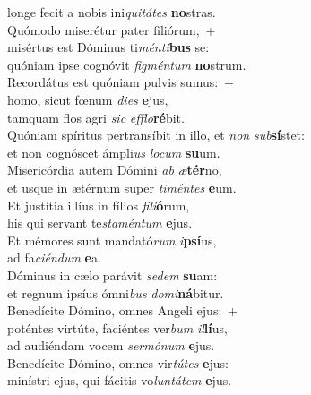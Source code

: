\evenverse longe fecit a nobis ini\textit{qui}\textit{tá}\textit{tes} \textbf{no}stras.\\
\oddverse Quómodo miserétur pater filiórum,~+\\
\oddverse  misértus est Dóminus ti\textit{mén}\textit{ti}\textbf{bus} se:~\*\\
\oddverse quóniam ipse cognóvit \textit{fig}\textit{mén}\textit{tum} \textbf{no}strum.\\
\evenverse Recordátus est quóniam pulvis sumus:~+\\
\evenverse  homo, sicut fœnum \textit{di}\textit{es} \textbf{e}jus,~\*\\
\evenverse tamquam flos agri \textit{sic} \textit{ef}\textit{flo}\textbf{ré}bit.\\
\oddverse Quóniam spíritus pertransíbit in illo, et \textit{non} \textit{sub}\textbf{sí}stet:~\*\\
\oddverse et non cognóscet ámpli\textit{us} \textit{lo}\textit{cum} \textbf{su}um.\\
\evenverse Misericórdia autem Dómini \textit{ab} \textit{æ}\textbf{tér}no,~\*\\
\evenverse et usque in ætérnum super \textit{ti}\textit{mén}\textit{tes} \textbf{e}um.\\
\oddverse Et justítia illíus in fílios \textit{fi}\textit{li}\textbf{ó}rum,~\*\\
\oddverse his qui servant te\textit{sta}\textit{mén}\textit{tum} \textbf{e}jus.\\
\evenverse Et mémores sunt mandató\textit{rum} \textit{i}\textbf{psí}us,~\*\\
\evenverse ad fa\textit{ci}\textit{én}\textit{dum} \textbf{e}a.\\
\oddverse Dóminus in cælo parávit \textit{se}\textit{dem} \textbf{su}am:~\*\\
\oddverse et regnum ipsíus ómni\textit{bus} \textit{do}\textit{mi}\textbf{ná}bitur.\\
\evenverse Benedícite Dómino, omnes Angeli ejus:~+\\
\evenverse  poténtes virtúte, faciéntes ver\textit{bum} \textit{il}\textbf{lí}us,~\*\\
\evenverse ad audiéndam vocem \textit{ser}\textit{mó}\textit{num} \textbf{e}jus.\\
\oddverse Benedícite Dómino, omnes vir\textit{tú}\textit{tes} \textbf{e}jus:~\*\\
\oddverse minístri ejus, qui fácitis vo\textit{lun}\textit{tá}\textit{tem} \textbf{e}jus.\\
